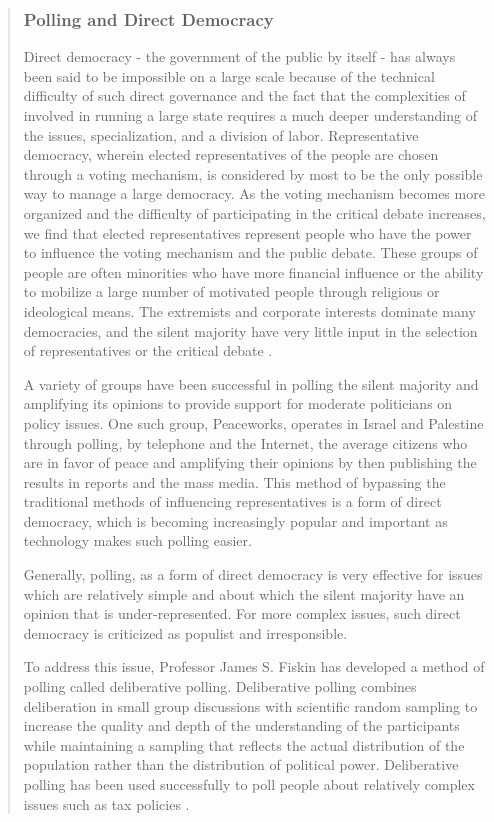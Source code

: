 \begin{quote}
\subsubsection{Polling and Direct Democracy}

Direct democracy - the government of the public by itself - has always been said to be impossible on a large scale because of the technical difficulty of such direct governance and the fact that the complexities of involved in running a large state requires a much deeper understanding of the issues, specialization, and a division of labor. Representative democracy, wherein elected representatives of the people are chosen through a voting mechanism, is considered by most to be the only possible way to manage a large democracy.
As the voting mechanism becomes more organized and the difficulty of participating in the critical debate increases, we find that elected representatives represent people who have the power to influence the voting mechanism and the public debate. These groups of people are often minorities who have more financial influence or the ability to mobilize a large number of motivated people through religious or ideological means. The extremists and corporate interests dominate many democracies, and the silent majority have very little input in the selection of representatives or the critical debate \cite{rebuildjoiito}.

A variety of groups have been successful in polling the silent majority and amplifying its opinions to provide support for moderate politicians on policy issues. One such group, Peaceworks, operates in Israel and Palestine through polling, by telephone and the Internet, the average citizens who are in favor of peace and amplifying their opinions by then publishing the results in reports and the mass media. This method of bypassing the traditional methods of influencing representatives is a form of direct democracy, which is becoming increasingly popular and important as technology makes such polling easier.

Generally, polling, as a form of direct democracy is very effective for issues which are relatively simple and about which the silent majority have an opinion that is under-represented. For more complex issues, such direct democracy is criticized as populist and irresponsible.

To address this issue, Professor James S. Fiskin has developed a method of polling called deliberative polling. Deliberative polling combines deliberation in small group discussions with scientific random sampling to increase the quality and depth of the understanding of the participants while maintaining a sampling that reflects the actual distribution of the population rather than the distribution of political power. Deliberative polling has been used successfully to poll people about relatively complex issues such as tax policies \cite{fishkin2000deliberative}.


\end{quote}
